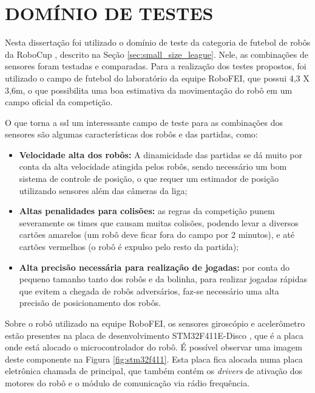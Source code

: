 \documentclass[acronym, symbols, table, deposito]{fei}
\begin{document}
	\section{DOMÍNIO DE TESTES} \label{sec:dominio_de_testes}
	
		Nesta dissertação foi utilizado o domínio de teste da categoria  de futebol de robôs da RoboCup \cite{RoboCup}, descrito na Seção \ref{sec:small_size_league}. Nele, as combinações de sensores foram testadas e comparadas. Para a realização dos testes propostos, foi utilizado o campo de futebol do laboratório da equipe RoboFEI, que possui 4,3 X 3,6m, o que possibilita uma boa estimativa da movimentação do robô em um campo oficial da competição.
		
		O que torna a \acrshort{ssl} um interessante campo de teste para as combinações dos sensores são algumas características dos robôs e das partidas, como:
		
		\begin{itemize}
			\item \textbf{Velocidade alta dos robôs:} A dinamicidade das partidas se dá muito por conta da alta velocidade atingida pelos robôs, sendo necessário um bom sistema de controle de posição, o que requer um estimador de posição utilizando sensores além das câmeras da liga;
			
			\item \textbf{Altas penalidades para colisões:} as regras da competição punem severamente os times que causam muitas colisões, podendo levar a diversos cartões amarelos (um robô deve ficar fora do campo por 2 minutos), e até cartões vermelhos (o robô é expulso pelo resto da partida);
			
			\item \textbf{Alta precisão necessária para realização de jogadas:} por conta do pequeno tamanho tanto dos robôs e da bolinha, para realizar jogadas rápidas que evitem a chegada de robôs adversários, faz-se necessário uma alta precisão de posicionamento dos robôs.
		\end{itemize}
		
		Sobre o robô utilizado na equipe RoboFEI, os sensores giroscópio e acelerômetro estão presentes na placa de desenvolvimento STM32F411E-Disco \cite{datasheet_micro}, que é a placa onde está alocado o microcontrolador do robô. É possível observar uma imagem deste componente na Figura \ref{fig:stm32f411}. Esta placa fica alocada numa placa eletrônica chamada de principal, que também contém os \textit{drivers} de ativação dos motores do robô e o módulo de comunicação via rádio frequência.
		
\end{document}
